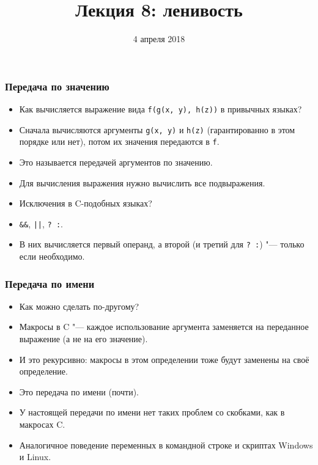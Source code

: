 \documentclass[11pt]{beamer}
\title{Лекция 8: ленивость}
\date{4 апреля 2018}
\begin{document}
\begin{frame}[plain]
\maketitle
\end{frame}

\begin{frame}[fragile]
\frametitle{Передача по значению}
\begin{itemize}
    \item Как вычисляется выражение вида \lstinline|f(g(x, y), h(z))| в привычных языках?
    \pause
    \item Сначала вычисляются аргументы \lstinline|g(x, y)| и \lstinline|h(z)| (гарантированно в этом порядке или нет), потом их значения передаются в \lstinline|f|.
    \item Это называется передачей аргументов по значению.
    \item Для вычисления выражения нужно вычислить все подвыражения.
    \item Исключения в C-подобных языках?
    \pause
    \item \lstinline|&&|, \lstinline{||}, \lstinline|? :|.
    \pause
    \item В них вычисляется первый операнд, а второй (и третий для \lstinline|? :|) "--- только если необходимо.
\end{itemize}
\end{frame}

\begin{frame}[fragile]
\frametitle{Передача по имени}
\begin{itemize}
    \item Как можно сделать по-другому?
    \pause
    \item Макросы в C "--- каждое использование аргумента заменяется на переданное выражение (а не на его значение).
    \item И это рекурсивно: макросы в этом определении тоже будут заменены на своё определение.
    \item Это передача по имени (почти).
    \pause
    \item У настоящей передачи по имени нет таких проблем со скобками, как в макросах C.
    \pause
    \item Аналогичное поведение переменных в командной строке и скриптах Windows и Linux.
\end{itemize}
\end{frame}
\end{document}
